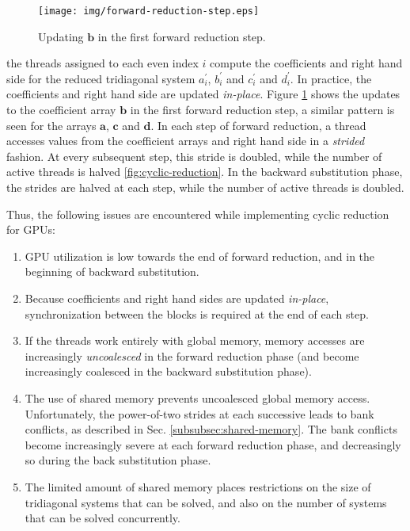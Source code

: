 \begin{figure}
\begin{center}
\texttt{[image: img/forward-reduction-step.eps]}
\end{center}
\caption{Updating $\bm{b}$ in the first forward reduction step.}
\label{fig:forward-reduction-step}
\end{figure}

the threads assigned to each even index $i$
compute the coefficients
and right hand side for the reduced tridiagonal system
$a_i^\prime$, $b_i^\prime$ and $c_i^\prime$
and $d_i^\prime$.
In practice, the coefficients and right hand side
are updated \emph{in-place}.
Figure \ref{fig:forward-reduction-step} shows the updates
to the coefficient array $\bm{b}$
in the first forward reduction step,
a similar pattern is seen for the arrays
$\bm{a}$, $\bm{c}$ and $\bm{d}$.
In each step of forward reduction,
a thread accesses values from the
coefficient arrays and right hand side
in a \emph{strided} fashion.
At every subsequent step,
this stride is doubled, while the number of active threads is halved
\ref{fig:cyclic-reduction}.
In the backward substitution phase,
the strides are halved at each step,
while the number of active threads is doubled.

Thus, the following issues are encountered
while implementing cyclic reduction for GPUs:

\begin{enumerate}
    \item GPU utilization is low towards the end of forward reduction,
        and in the beginning of backward substitution.

    \item Because coefficients and right hand sides
        are updated \emph{in-place},
        synchronization between the blocks is required at
        the end of each step.

    \item If the threads work entirely with global memory,
        memory accesses are increasingly
        \emph{uncoalesced} in the forward reduction phase
        (and become increasingly coalesced in the
        backward substitution phase).

    \item The use of shared memory prevents
        uncoalesced global memory access.
        Unfortunately,
        the power-of-two strides at each successive
        leads to bank conflicts,
        as described in Sec. \ref{subsubsec:shared-memory}.
        The bank conflicts become increasingly severe
        at each forward reduction phase,
        and decreasingly so during the back substitution phase.
        
    \item The limited amount of shared memory places restrictions
        on the size of tridiagonal systems that can be solved,
        and also on the number of systems that can be solved
        concurrently.
\end{enumerate}

